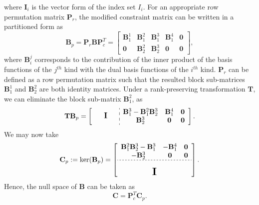 \documentclass[preprint,12pt]{elsarticle}
\begin{document}
where $\mathbf{I}_i$ is the vector form of the index set  $I_i$. For an appropriate row permutation matrix $\mathbf{P}_r$, the modified constraint matrix can be written in a partitioned form as
\begin{equation}
    \mathbf{B}_p=\mathbf{P}_r\mathbf{B}\mathbf{P}_c^T=
    \begin{bmatrix}
        \mathbf{B}_1^1 & \mathbf{B}_1^2 & \mathbf{B}_1^3 & \mathbf{B}_1^4 & \mathbf{0} \\
        \mathbf{0} & \mathbf{B}_2^2 & \mathbf{B}_2^3 & \mathbf{0} & \mathbf{0}
    \end{bmatrix},
\end{equation}
where $\mathbf{B}_i^j$ corresponds to the contribution of the inner product of the basis functions of the $j^{th}$ kind with the dual basis functions of the $i^{th}$ kind. $\mathbf{P}_r$ can be defined as a row permutation matrix such that the resulted block sub-matrices $\mathbf{B}_1^1$ and $\mathbf{B}_2^2$ are both identity matrices. Under a rank-preserving transformation $\mathbf{T}$, we can eliminate the block sub-matrix $\mathbf{B}_1^2$, as
\begin{equation}
    \sbox0{$\begin{matrix}\mathbf{B}_1^3-\mathbf{B}_1^2\mathbf{B}_2^3 & \mathbf{B}_1^4 & \mathbf{0} \\ \mathbf{B}_2^3 & \mathbf{0} & \mathbf{0}\end{matrix}$}
    \mathbf{T}\mathbf{B}_p=\left[
        \begin{array}{c:c}
            \makebox[\wd0/3]{\large $\mathbf{I}$} & \usebox{0}\\
        \end{array}
        \right].\label{eq:simple_form}
\end{equation}
We may now take
\begin{equation}
    \mathbf{C}_p:=\ker(\mathbf{B}_p)=
  \left[\begin{array}{ccc}
    \mathbf{B}_1^2\mathbf{B}_2^3-\mathbf{B}_1^3 & -\mathbf{B}_1^4 & \mathbf{0} \\ 
    -\mathbf{B}_2^3 & \mathbf{0} & \mathbf{0} \\ \hdashline[2pt/2pt]
     \multicolumn{3}{c}{\multirow{3}{*}{\raisebox{0mm}{\scalebox{1.5}{$\mathbf{I}$}}}} \\
     & &
  \end{array}\right].
\end{equation}
Hence, the null space of $\mathbf{B}$ can be taken as
\begin{equation}
    \mathbf{C}=\mathbf{P}_c^T\mathbf{C}_p.
\end{equation}
\end{document}
